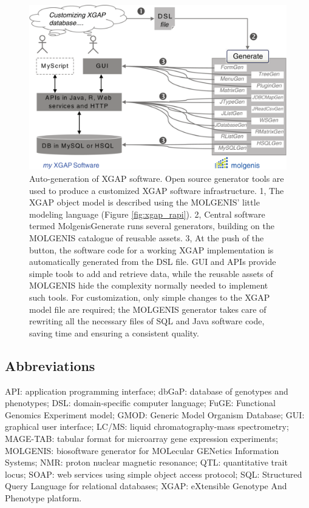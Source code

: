 \begin{figure}
	\includegraphics[width=1.0\linewidth]{img/xgap_generate}
	\caption[Auto-generation of XGAP software]{Auto-generation of XGAP software. Open source generator tools are used to produce a customized XGAP software infrastructure. 1, The XGAP object model is described using the MOLGENIS’ little modeling language (Figure \ref{fig:xgap_rapi}). 2, Central software termed MolgenisGenerate runs several generators, building on the MOLGENIS catalogue of reusable assets. 3, At the push of the button, the software code for a working XGAP implementation is automatically generated from the DSL file. GUI and APIs provide simple tools to add and retrieve data, while the reusable assets of MOLGENIS hide the complexity normally needed to implement such tools. For customization, only simple changes to the XGAP model file are required; the MOLGENIS generator takes care of rewriting all the necessary files of SQL and Java software code, saving time and ensuring a consistent quality.}
	\label{fig:xgap_generate}
\end{figure}

\subsection*{Abbreviations}
API: application programming interface; dbGaP: database of genotypes and phenotypes; DSL: domain-specific computer language; FuGE: Functional Genomics Experiment model; GMOD: Generic Model Organism Database; GUI: graphical user interface; LC/MS: liquid chromatography-mass spectrometry; MAGE-TAB: tabular format for microarray gene expression experiments; MOLGENIS: biosoftware generator for MOLecular GENetics Information Systems; NMR: proton nuclear magnetic resonance; QTL: quantitative trait locus; SOAP: web services using simple object access protocol; SQL: Structured Query Language for relational databases; XGAP: eXtensible Genotype And Phenotype platform.

